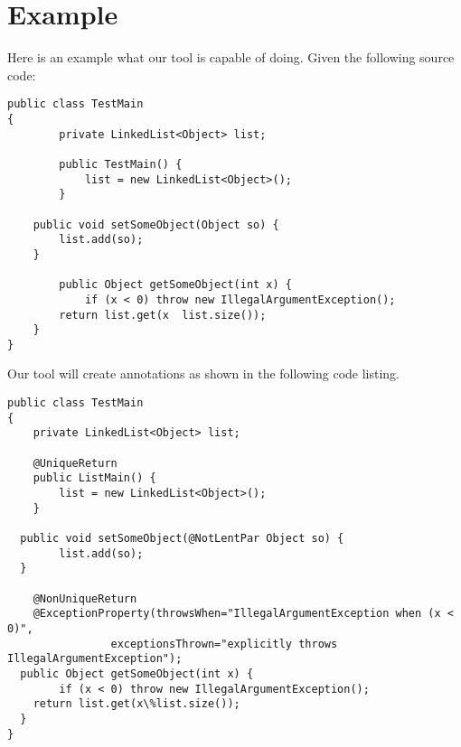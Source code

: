 \section{Example}

Here is an example what our tool is capable of doing. Given the following
source code:

\begin{lstlisting}
public class TestMain
{
		private LinkedList<Object> list;
		
		public TestMain() {
			list = new LinkedList<Object>();
		}
		
    public void setSomeObject(Object so) {
    	list.add(so);
    }
    
		public Object getSomeObject(int x) {
			if (x < 0) throw new IllegalArgumentException();
    	return list.get(x  list.size());
    }
}
\end{lstlisting}

Our tool will create annotations as shown in the following code listing.

\begin{lstlisting}
public class TestMain
{
	private LinkedList<Object> list;

	@UniqueReturn
	public ListMain() {
		list = new LinkedList<Object>();
	}
		
  public void setSomeObject(@NotLentPar Object so) {
		list.add(so);
  }
		
	@NonUniqueReturn
	@ExceptionProperty(throwsWhen="IllegalArgumentException when (x < 0)", 
				exceptionsThrown="explicitly throws IllegalArgumentException");
  public Object getSomeObject(int x) {
		if (x < 0) throw new IllegalArgumentException();
   	return list.get(x\%list.size());
  }
}
\end{lstlisting}